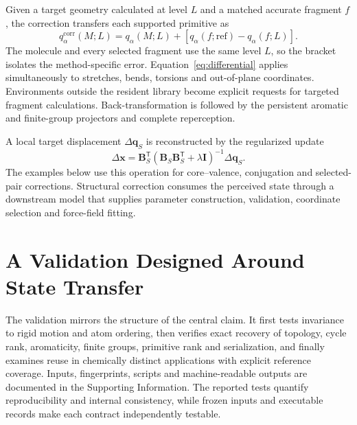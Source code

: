 \documentclass[journal=jctcce,manuscript=article]{achemso}
\begin{document}
Given a target geometry calculated at level $L$ and a matched accurate
fragment $f$, the correction transfers each supported primitive as
\begin{equation}
q_\alpha^{\mathrm{corr}}(M;L)=q_\alpha(M;L)+
\left[q_\alpha(f;\mathrm{ref})-q_\alpha(f;L)\right].
\label{eq:differential}
\end{equation}
The molecule and every selected fragment use the same level $L$, so the
bracket isolates the method-specific error.
Equation~\ref{eq:differential} applies simultaneously to stretches, bends,
torsions and out-of-plane coordinates.  Environments outside the resident
library become explicit requests for targeted fragment calculations.
Back-transformation is
followed by the persistent aromatic and finite-group projectors and complete
reperception.

A local target displacement $\Delta\mathbf q_S$ is reconstructed by the
regularized update
\begin{equation}
\Delta\mathbf x=
\mathbf B_S^\mathsf T
\left(\mathbf B_S\mathbf B_S^\mathsf T+\lambda\mathbf I\right)^{-1}
\Delta\mathbf q_S.
\label{eq:backtransform}
\end{equation}
The examples below use this operation for core--valence, conjugation and
selected-pair corrections.  Structural correction consumes the
perceived state through a downstream model that supplies parameter
construction, validation, coordinate selection and force-field fitting.

\section{A Validation Designed Around State Transfer}

The validation mirrors the structure of the central claim.  It first tests
invariance to rigid motion and atom ordering, then verifies exact recovery of
topology, cycle rank, aromaticity, finite groups, primitive rank and
serialization, and finally examines reuse in chemically distinct applications
with explicit reference coverage.  Inputs, fingerprints, scripts and
machine-readable outputs are documented in the Supporting Information.  The reported tests
quantify reproducibility and internal consistency, while frozen inputs and
executable records make each contract independently testable.
\end{document}
